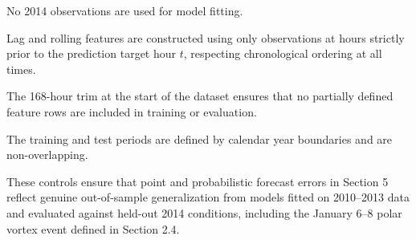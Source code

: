 No 2014 observations are used for model fitting.


Lag and rolling features are constructed using only observations at hours strictly prior to the prediction target hour $t$, respecting chronological ordering at all times.


The 168-hour trim at the start of the dataset ensures that no partially defined feature rows are included in training or evaluation.


The training and test periods are defined by calendar year boundaries and are non-overlapping.


These controls ensure that point and probabilistic forecast errors in Section 5 reflect genuine out-of-sample generalization from models fitted on 2010–2013 data and evaluated against held-out 2014 conditions, including the January 6–8 polar vortex event defined in Section 2.4.